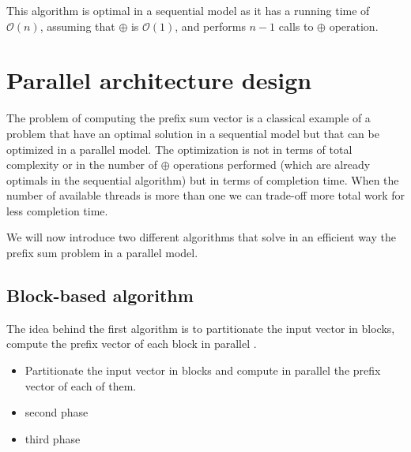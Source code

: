 \documentclass{article}
\begin{document}
This algorithm is optimal in a sequential model as it has a running time of $\mathcal{O}(n)$, assuming that $\oplus$ is $\mathcal{O}(1)$, and performs $n-1$ calls to $\oplus$ operation.
 
\section{Parallel architecture design}

The problem of computing the prefix sum vector is a classical example of a problem that have an optimal solution in a sequential model but that can be optimized in a parallel model. 
The optimization is not in terms of total complexity or in the number of $\oplus$ operations performed (which are already optimals in the sequential algorithm) but in terms of completion time. When the number of available threads is more than one we can trade-off more total work for less completion time.
\medskip

We will now introduce two different algorithms that solve in an efficient way the prefix sum problem in a parallel model. 

\subsection{Block-based algorithm}

The idea behind the first algorithm is to partitionate the input vector in blocks, compute the prefix vector of each block in parallel .

\begin{itemize}
  \item Partitionate the input vector in blocks and compute in parallel the prefix vector of each of them.
  \item second phase
  \item third phase
\end{itemize}
\end{document}
